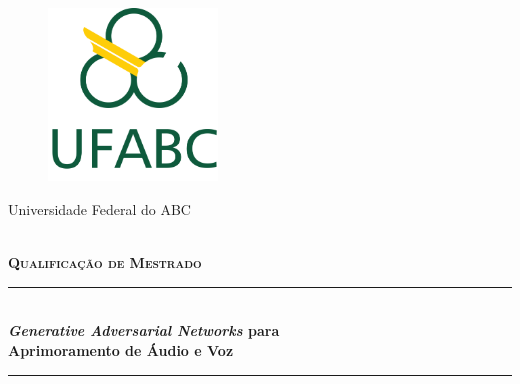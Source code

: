 \begin{titlepage}
		\newcommand{\HRule}{\rule{\linewidth}{0.5mm}}

		\center

		\begin{figure}
			\centering
			\includegraphics[width=0.4\textwidth]{figs/logo_ufabc.png}
		\end{figure}

		\Huge{Universidade Federal do ABC}
		\vspace{0.25cm}

		\\[0.5cm]
		\textsc{\textbf{\Large Qualificação de Mestrado}}\\[0.5cm] %


		\vspace{1.0cm}

		\HRule \\[0.4cm]
		{ \huge \bfseries \textit{Generative Adversarial Networks} para \\[0.5cm] Aprimoramento de Áudio e Voz}\\[0.25cm] %
		\HRule \\[1.0cm]

		\vspace{0.5cm}



\end{titlepage}
